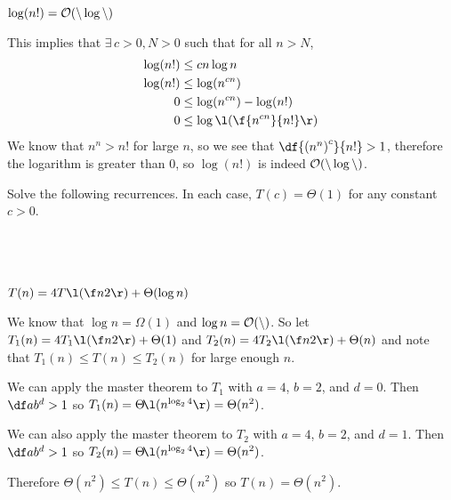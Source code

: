 \documentclass[a4paper]{article}
\begin{document}
\subsection{~} %

\begin{questionbody}
$\log (n!) = \cal O(n \log n)$
\end{questionbody}

This implies that $\exists\, c > 0, N > 0$ such that for all $n > N$, \begin{align*}
\log (n!) &\le c n \log n\\
\log (n!) &\le \log(n^{cn})\\
0 &\le \log(n^{cn}) - \log(n!)\\
0 &\le \log\l(\f{n^{cn}}{n!}\r)
\end{align*}
We know that $n^n > n! $ for large $n$, so we see that $\df{{(n^n)}^c}{n!} > 1$, therefore the logarithm is greater than $0$, so $\log(n!)$ is indeed $\cal O(n \log n)$.


\begin{questionbody}
Solve the following recurrences. In each case, $T(c) = \Theta(1)$ for any constant $c > 0$.
\end{questionbody}

\subsection{~} %

\begin{questionbody}
$T(n) = 4T\l(\f n2\r) + \Theta(\log n)$
\end{questionbody}

We know that $\log n = \Omega(1)$ and $\log n = \cal O(n)$. So let $T_1(n) = 4T_1\l(\f n2\r) + \Theta(1)$ and $T_2(n) = 4T_2\l(\f n2\r) + \Theta(n)$ and note that $T_1(n) \le T(n) \le T_2(n)$ for large enough $n$.

We can apply the master theorem to $T_1$ with $a=4$, $b=2$, and $d=0$. Then $\df a{b^d} > 1$ so $T_1(n) = \Theta\!\l(n^{\log_2 4}\r) = \Theta(n^2)$.

We can also apply the master theorem to $T_2$ with $a=4$, $b=2$, and $d=1$. Then $\df a{b^d} > 1$ so $T_2(n) = \Theta\!\l(n^{\log_2 4}\r) = \Theta(n^2)$.

Therefore $\Theta(n^2) \le T(n) \le \Theta(n^2)$ so $T(n) = \Theta(n^2)$.

\subsection{~} %
\end{document}
